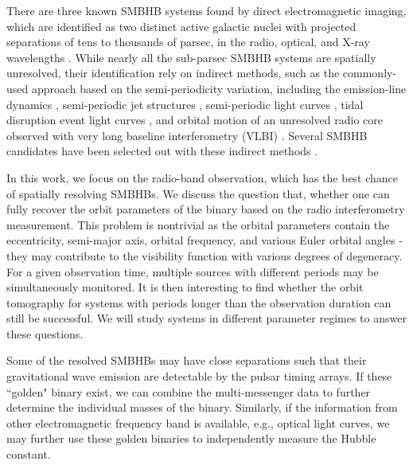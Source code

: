 \documentclass[twocolumn]{aastex62}
\begin{document}
There are three known SMBHB systems found by direct electromagnetic imaging, which are identified as two distinct active galactic nuclei with projected separations of tens to thousands of parsec, in the radio, optical, and X-ray wavelengths \citep{Komossa2003ApJL, Rodriguez20060402, Fu2011}. 
While nearly all the sub-parsec SMBHB systems are spatially unresolved, their identification rely on indirect methods, such as the commonly-used approach based on the semi-periodicity variation,  including the emission-line dynamics \citep[e.g., ][]{Bogdanovic2009, ShenLoeb2010, Tsalmantza2011, Eracleous2012, Decarli2013, McKernan2013, Shen_etal2013ApJ, Liu2014ApJL, Liu_etal2016}, semi-periodic jet structures \citep[e.g., ][]{Begelman1980Nature, Conway1995}, semi-periodic light curves \citep[e.g., ][]{Graham2015, DOrazio:2015nature, Andjelka2019, Saade2020, Komossa2021, Komossa:2021exd}, tidal disruption event light curves \citep[e.g., ][]{Liu2009ApJL, StoneLoeb2011, Liufukun2014, Coughlin2017}, and orbital motion of an  unresolved radio core observed with very long baseline interferometry (VLBI) \citep[e.g., ][]{Sudou2003, D_Orazio_2018VLBI, Breiding2021}. Several SMBHB candidates have been selected out with these indirect methods \citep{Valtonen2008Natur, Bogdanovic2009, Liufukun2014, Graham2015, LiYR2017}. 

In this work, we focus on the radio-band observation, which has the best chance of spatially resolving SMBHBs. We discuss the question that, whether one can fully recover the orbit parameters of the binary based on the radio interferometry measurement. This problem is nontrivial as the orbital parameters contain the eccentricity, semi-major axis, orbital frequency, and various Euler orbital angles - they may contribute to the visibility function with various degrees of degeneracy. For a given observation time, multiple sources with different periods may be simultaneously monitored. It is then interesting to find whether the orbit tomography for systems with periods longer than the observation duration can still be successful. We will study systems in different parameter regimes to answer these questions.

Some of the resolved SMBHBs may have close separations such that their gravitational wave emission  are detectable by the pulsar timing arrays. If these ``golden" binary exist, we can combine the multi-messenger data to further determine the individual masses of the binary. Similarly,  if the information from other electromagnetic frequency  band is available, e.g., optical light curves, we may further use these golden binaries to independently measure the Hubble constant.
\end{document}

